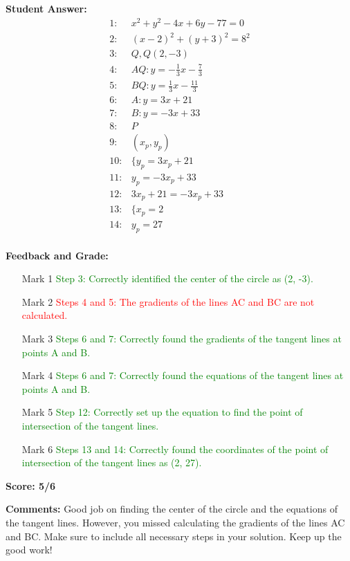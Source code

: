 \documentclass{article}
\begin{document}
\textbf{Student Answer:}
\begin{align*}
1: & x^2+y^2-4x+6y-77=0 \\
2: & (x-2)^2+(y+3)^2=8^2 \\
3: & Q,Q(2,-3) \\
4: & AQ:y=-\frac{1}{3}x-\frac{7}{3} \\
5: & BQ:y=\frac{1}{3}x-\frac{11}{3} \\
6: & A:y=3x+21 \\
7: & B:y=-3x+33 \\
8: & P \\
9: & (x_p,y_p) \\
10: & \{y_p=3x_p+21 \\
11: & y_p=-3x_p+33 \\
12: & 3x_p+21=-3x_p+33 \\
13: & \{x_p=2 \\
14: & y_p=27 \\
\end{align*}

\textbf{Feedback and Grade:}
\begin{itemize}
\item[Mark 1] \textcolor{green}{Step 3: Correctly identified the center of the circle as (2, -3).}
\item[Mark 2] \textcolor{red}{Steps 4 and 5: The gradients of the lines AC and BC are not calculated.}
\item[Mark 3] \textcolor{green}{Steps 6 and 7: Correctly found the gradients of the tangent lines at points A and B.}
\item[Mark 4] \textcolor{green}{Steps 6 and 7: Correctly found the equations of the tangent lines at points A and B.}
\item[Mark 5] \textcolor{green}{Step 12: Correctly set up the equation to find the point of intersection of the tangent lines.}
\item[Mark 6] \textcolor{green}{Steps 13 and 14: Correctly found the coordinates of the point of intersection of the tangent lines as (2, 27).}
\end{itemize}

\textbf{Score: 5/6}

\textbf{Comments:} Good job on finding the center of the circle and the equations of the tangent lines. However, you missed calculating the gradients of the lines AC and BC. Make sure to include all necessary steps in your solution. Keep up the good work!
\end{document}
